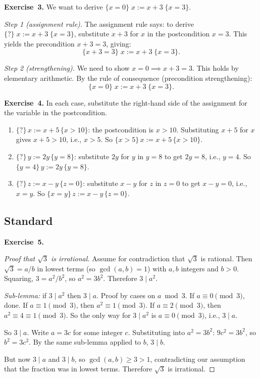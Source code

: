 \documentclass[11pt]{article}
\begin{document}
\medskip
\textbf{Exercise~3.}
We want to derive $\{x = 0\}\; x := x + 3\;\{x = 3\}$.

\emph{Step 1 (assignment rule).} The assignment rule says: to derive
$\{?\}\; x := x + 3\;\{x = 3\}$, substitute $x + 3$ for $x$ in the
postcondition $x = 3$. This yields the precondition $x + 3 = 3$, giving:
\[
  \{x + 3 = 3\}\; x := x + 3\;\{x = 3\}.
\]

\emph{Step 2 (strengthening).} We need to show $x = 0 \implies x + 3 = 3$.
This holds by elementary arithmetic. By the rule of consequence
(precondition strengthening):
\[
  \{x = 0\}\; x := x + 3\;\{x = 3\}.
\]

\medskip
\textbf{Exercise~4.}
In each case, substitute the right-hand side of the assignment for the variable in the postcondition.
\begin{enumerate}[label=(\alph*)]
  \item $\{?\}\, x := x + 5\, \{x > 10\}$: the postcondition is $x > 10$. Substituting $x + 5$ for $x$ gives $x + 5 > 10$, i.e., $x > 5$. So $\{x > 5\}\, x := x + 5\, \{x > 10\}$.
  \item $\{?\}\, y := 2y\, \{y = 8\}$: substitute $2y$ for $y$ in $y = 8$ to get $2y = 8$, i.e., $y = 4$. So $\{y = 4\}\, y := 2y\, \{y = 8\}$.
  \item $\{?\}\, z := x - y\, \{z = 0\}$: substitute $x - y$ for $z$ in $z = 0$ to get $x - y = 0$, i.e., $x = y$. So $\{x = y\}\, z := x - y\, \{z = 0\}$.
\end{enumerate}

\subsection*{Standard}

\textbf{Exercise~5.}
\begin{proof}[Proof that $\sqrt{3}$ is irrational]
Assume for contradiction that $\sqrt{3}$ is rational. Then $\sqrt{3} = a/b$ in lowest terms (so $\gcd(a, b) = 1$) with $a, b$ integers and $b > 0$. Squaring, $3 = a^2/b^2$, so $a^2 = 3b^2$. Therefore $3 \mid a^2$.

\emph{Sub-lemma:} if $3 \mid a^2$ then $3 \mid a$. Proof by cases on $a \bmod 3$. If $a \equiv 0 \pmod 3$, done. If $a \equiv 1 \pmod 3$, then $a^2 \equiv 1 \pmod 3$. If $a \equiv 2 \pmod 3$, then $a^2 \equiv 4 \equiv 1 \pmod 3$. So the only way for $3 \mid a^2$ is $a \equiv 0 \pmod 3$, i.e., $3 \mid a$. \checkmark

So $3 \mid a$. Write $a = 3c$ for some integer $c$. Substituting into $a^2 = 3b^2$: $9c^2 = 3b^2$, so $b^2 = 3c^2$. By the same sub-lemma applied to $b$, $3 \mid b$.

But now $3 \mid a$ and $3 \mid b$, so $\gcd(a, b) \geq 3 > 1$, contradicting our assumption that the fraction was in lowest terms. Therefore $\sqrt{3}$ is irrational.
\end{proof}
\end{document}
